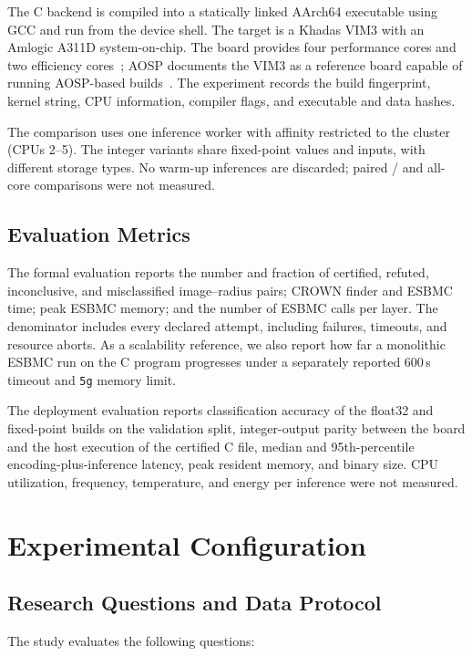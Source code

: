 The C backend is compiled into a statically linked AArch64 executable using GCC and run from the device shell. The target is a Khadas VIM3 with an Amlogic A311D system-on-chip. The board provides four \Aseven{} performance cores and two \Athree{} efficiency cores~\cite{KhadasVIM3}; AOSP documents the VIM3 as a reference board capable of running AOSP-based builds~\cite{AOSPReferenceBoards}. The experiment records the build fingerprint, kernel string, CPU information, compiler flags, and executable and data hashes.

The comparison uses one inference worker with affinity restricted to the \Aseven{} cluster (CPUs 2--5). The integer variants share fixed-point values and inputs, with different storage types. No warm-up inferences are discarded; paired \Athree{}/\Aseven{} and all-core comparisons were not measured.

\subsection{Evaluation Metrics}
The formal evaluation reports the number and fraction of certified, refuted, inconclusive, and misclassified image--radius pairs; CROWN finder and ESBMC time; peak ESBMC memory; and the number of ESBMC calls per layer. The denominator includes every declared attempt, including failures, timeouts, and resource aborts. As a scalability reference, we also report how far a monolithic ESBMC run on the C program progresses under a separately reported 600\,s timeout and \texttt{5g} memory limit.

The deployment evaluation reports classification accuracy of the float32 and fixed-point builds on the validation split, integer-output parity between the board and the host execution of the certified C file, median and 95th-percentile encoding-plus-inference latency, peak resident memory, and binary size. CPU utilization, frequency, temperature, and energy per inference were not measured.


\section{Experimental Configuration}
\label{sec:setup}

\subsection{Research Questions and Data Protocol}

The study evaluates the following questions:

